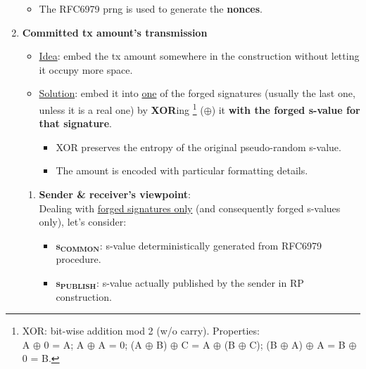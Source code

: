 \documentclass[10.5pt,compress]{beamer}
\begin{document}
\begin{frame}[allowframebreaks]
\begin{enumerate}
        \begin{itemize}
            \item The RFC6979 prng is used to generate the \textbf{nonces}.
        \end{itemize}
        \framebreak
        \item \textbf{Committed tx amount's transmission}
        \begin{itemize}
            \item \underline{Idea}: embed the tx amount somewhere in the construction without letting it occupy more space. %
            \item \underline{Solution}: embed it into \underline{one} of the forged signatures (usually the last one, unless it is a real one) by \textbf{XOR}ing \footnote{\tiny{XOR: bit-wise addition mod 2 (w/o carry). Properties:\\ A $\oplus$ 0 = A; \quad A $\oplus$ A = 0; \quad (A $\oplus$ B) $\oplus$ C = A $\oplus$ (B $\oplus$ C); \quad (B $\oplus$ A) $\oplus$ A = B $\oplus$ 0 = B.}} ($\oplus$) it \textbf{with the forged s-value for that signature}.
            \begin{itemize}
                \item XOR preserves the entropy of the original pseudo-random s-value. %
                \item The amount is encoded with particular formatting details.
            \end{itemize}
        \end{itemize}
        \begin{enumerate}
            \item \textbf{Sender \& receiver's viewpoint}:\\
            Dealing with \underline{forged signatures only} (and consequently forged s-values only), let's consider:
            \begin{itemize}
                \item $\boldsymbol{s_{COMMON}}$: s-value deterministically generated from RFC6979 procedure. %
                \item $\boldsymbol{s_{PUBLISH}}$: s-value actually published by the sender in RP construction.

\end{itemize}
\end{enumerate}
\end{enumerate}
\end{frame}
\end{document}
